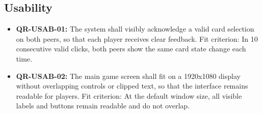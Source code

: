 \documentclass[a4paper,12pt]{article}
\begin{document}
    \subsection{Usability}
    \begin{itemize}
        \item \textbf{QR-USAB-01:} The system shall visibly acknowledge a valid card selection on both peers, so that each player receives clear feedback. Fit criterion: In 10 consecutive valid clicks, both peers show the same card state change each time.
        \item \textbf{QR-USAB-02:} The main game screen shall fit on a 1920x1080 display without overlapping controls or clipped text, so that the interface remains readable for players. Fit criterion: At the default window size, all visible labels and buttons remain readable and do not overlap.
    \end{itemize}
\end{document}
